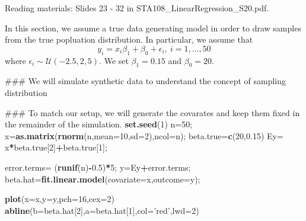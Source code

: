 \documentclass[12pt,]{book}
\newenvironment{Shaded}{\begin{snugshade}}{\end{snugshade}}
\newcommand{\KeywordTok}[1]{\textcolor[rgb]{0.13,0.29,0.53}{\textbf{#1}}}
\newcommand{\DataTypeTok}[1]{\textcolor[rgb]{0.13,0.29,0.53}{#1}}
\newcommand{\DecValTok}[1]{\textcolor[rgb]{0.00,0.00,0.81}{#1}}
\newcommand{\FloatTok}[1]{\textcolor[rgb]{0.00,0.00,0.81}{#1}}
\newcommand{\StringTok}[1]{\textcolor[rgb]{0.31,0.60,0.02}{#1}}
\newcommand{\OperatorTok}[1]{\textcolor[rgb]{0.81,0.36,0.00}{\textbf{#1}}}
\newcommand{\NormalTok}[1]{#1}
\begin{document}
Reading materials: Slides 23 - 32 in STA108\_LinearRegression\_S20.pdf.

In this section, we assume a true data generating model in order to draw
samples from the true popluation distribution. In particular, we assume
that \[ y_i = x_i \beta_1 + \beta_0 + \epsilon_i, \ i=1,\ldots, 50\]
where \(\epsilon_i \sim {\mathcal{U}}(-2.5, 2,5)\). We set
\(\beta_1=0.15\) and \(\beta_0=20\).

\begin{Shaded}
\begin{Highlighting}[]
\NormalTok{### We will simulate synthetic data to understand the concept of sampling distribution}

\NormalTok{### To match our setup, we will generate the covarates and keep them fixed in the remainder of the simulation. }
\KeywordTok{set.seed}\NormalTok{(}\DecValTok{1}\NormalTok{)}
\NormalTok{n=}\DecValTok{50}\NormalTok{;}
\NormalTok{x=}\KeywordTok{as.matrix}\NormalTok{(}\KeywordTok{rnorm}\NormalTok{(n,}\DataTypeTok{mean=}\DecValTok{10}\NormalTok{,}\DataTypeTok{sd=}\DecValTok{2}\NormalTok{),}\DataTypeTok{ncol=}\NormalTok{n);}
\NormalTok{beta.true=}\KeywordTok{c}\NormalTok{(}\DecValTok{20}\NormalTok{,}\FloatTok{0.15}\NormalTok{)}
\NormalTok{Ey=}\StringTok{ }\NormalTok{x}\OperatorTok{*}\NormalTok{beta.true[}\DecValTok{2}\NormalTok{]}\OperatorTok{+}\NormalTok{beta.true[}\DecValTok{1}\NormalTok{];}

\NormalTok{error.terms=}\StringTok{ }\NormalTok{(}\KeywordTok{runif}\NormalTok{(n)}\OperatorTok{-}\FloatTok{0.5}\NormalTok{)}\OperatorTok{*}\DecValTok{5}\NormalTok{;}
\NormalTok{y=Ey}\OperatorTok{+}\NormalTok{error.terms;}
\NormalTok{beta.hat=}\KeywordTok{fit.linear.model}\NormalTok{(}\DataTypeTok{covariate=}\NormalTok{x,}\DataTypeTok{outcome=}\NormalTok{y);}


\KeywordTok{plot}\NormalTok{(}\DataTypeTok{x=}\NormalTok{x,}\DataTypeTok{y=}\NormalTok{y,}\DataTypeTok{pch=}\DecValTok{16}\NormalTok{,}\DataTypeTok{cex=}\DecValTok{2}\NormalTok{)}
\KeywordTok{abline}\NormalTok{(}\DataTypeTok{b=}\NormalTok{beta.hat[}\DecValTok{2}\NormalTok{],}\DataTypeTok{a=}\NormalTok{beta.hat[}\DecValTok{1}\NormalTok{],}\DataTypeTok{col=}\StringTok{'red'}\NormalTok{,}\DataTypeTok{lwd=}\DecValTok{2}\NormalTok{)}
\end{Highlighting}
\end{Shaded}
\end{document}
